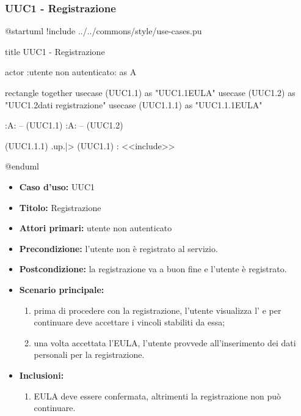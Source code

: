 \documentclass[casi-duso]{subfiles}
\begin{document}
\subsubsection*{UUC1 - Registrazione}%
\addtocounter{section}{1}
\label{subsub:UUC1utente}

\begin{plantuml}
@startuml
!include ../../commons/style/use-cases.pu

title UUC1 - Registrazione

actor :utente non autenticato: as A

rectangle {
  together {
    usecase (UUC1.1) as "UUC1.1\nVisualizzazione EULA"
    usecase (UUC1.2) as "UUC1.2\nInserimento dati registrazione"
    usecase (UUC1.1.1) as "UUC1.1.1\nConferma EULA"
  }
}

:A: -- (UUC1.1)
:A: -- (UUC1.2)

(UUC1.1.1) .up.|> (UUC1.1) : <<include>>

@enduml
\end{plantuml}

\begin{itemize}
  \item \textbf{Caso d’uso:} UUC1
  \item \textbf{Titolo:} Registrazione
  \item \textbf{Attori primari:} utente non autenticato
  \item \textbf{Precondizione:} l'utente non è registrato al servizio.
  \item \textbf{Postcondizione:} la registrazione va a buon fine e l'utente è registrato.
  \item \textbf{Scenario principale:}
        \begin{enumerate}
          \item prima di procedere con la registrazione, l'utente visualizza l' e per continuare deve accettare i vincoli stabiliti da essa;
          \item una volta accettata l'EULA, l'utente provvede all'inserimento dei dati personali per la registrazione.
        \end{enumerate}
  \item \textbf{Inclusioni:}
        \begin{enumerate}
          \item EULA deve essere confermata, altrimenti la registrazione non può continuare.
        \end{enumerate}
\end{itemize}
\end{document}
